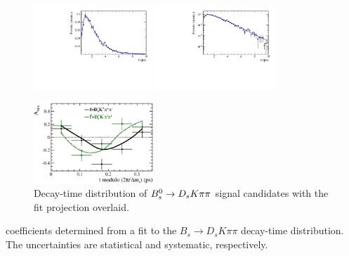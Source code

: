 \begin{figure}[h]
	\centering
		\includegraphics[width=0.4\textwidth, height = !]{figs/timeFit/signal/h_t.pdf} 
		\includegraphics[width=0.4\textwidth, height = !]{figs/timeFit/signal/h_t_log.pdf} 

		\includegraphics[width=0.4\textwidth, height = !]{figs/timeFit/signal/h_asym.eps} 		
		\caption{Decay-time distribution of ${{B}^0_{s}}\rightarrow{\ensuremath{{D}_{s}}}{\ensuremath{K}}{\ensuremath{\pi}}{\ensuremath{\pi}}$ signal candidates with the fit projection overlaid.} 
		\label{fig:tFitSig}
\end{figure}	

\begin{table}[h]
\centering
\caption{\CP coefficients determined from a fit to the $B_s \to D_s K \pi\pi$ decay-time distribution. The uncertainties are statistical and systematic, respectively.}
	\renewcommand{\arraystretch}{1.5}
	
\label{tab:sigFitResults}
\end{table}


